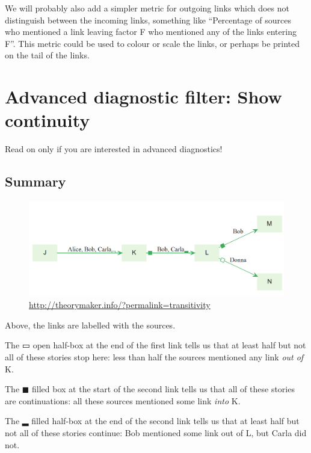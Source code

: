 \documentclass[
]{book}
\begin{document}
We will probably also add a simpler metric for outgoing links which does not distinguish between the incoming links, something like ``Percentage of sources who mentioned a link leaving factor F who mentioned any of the links entering F''. This metric could be used to colour or scale the links, or perhaps be printed on the tail of the links.

\hypertarget{advanced-diagnostic-filter-show-continuity}{%
\section{Advanced diagnostic filter: Show continuity}\label{advanced-diagnostic-filter-show-continuity}}

Read on only if you are interested in advanced diagnostics!

\hypertarget{summary-8}{%
\subsection{Summary}\label{summary-8}}

\begin{figure}
\centering
\includegraphics[width=6.77083in,height=\textheight]{_assets/image-20211222121147473.png}
\caption{\url{http://theorymaker.info/?permalink=transitivity}}
\end{figure}

Above, the links are labelled with the sources.

The ▭ open half-box at the end of the first link tells us that at least half but not all of these stories stop here: less than half the sources mentioned any link \emph{out of} K.

The ◼ filled box at the start of the second link tells us that all of these stories are continuations: all these sources mentioned some link \emph{into} K.

The ▂ filled half-box at the end of the second link tells us that at least half but not all of these stories continue: Bob mentioned some link out of L, but Carla did not.
\end{document}
